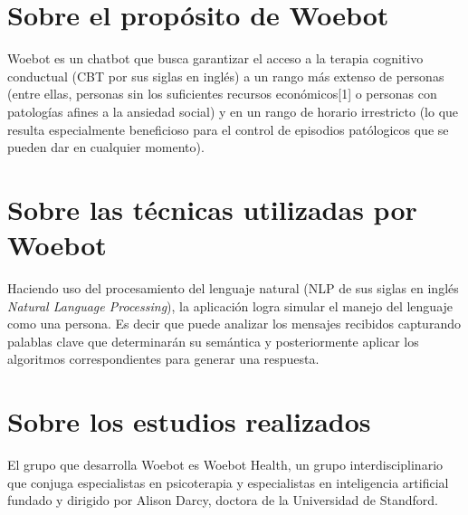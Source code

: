 \documentclass[11pt]{article}
\begin{document}


\section{Sobre el propósito de Woebot}
Woebot es un chatbot que busca garantizar el acceso a la terapia 
cognitivo conductual (CBT por sus siglas en inglés) a 
un rango más extenso de personas (entre ellas, personas 
sin los suficientes recursos económicos[1] o personas con 
patologías afines a la ansiedad social) y en un rango 
de horario irrestricto (lo que resulta especialmente 
beneficioso para el control de episodios patólogicos 
que se pueden dar en cualquier momento). 


\section{Sobre las técnicas utilizadas por Woebot}
Haciendo uso del procesamiento del lenguaje natural (NLP de sus siglas en inglés 
\textit{Natural Language Processing}), la aplicación 
logra simular el manejo del lenguaje como una persona. 
Es decir que puede analizar los mensajes recibidos 
capturando 
palablas clave 
que determinarán su semántica
y posteriormente aplicar los
algoritmos correspondientes para generar una respuesta.


\section{Sobre los estudios realizados}
El grupo que desarrolla Woebot es Woebot Health, un grupo interdisciplinario que conjuga especialistas en psicoterapia y especialistas en inteligencia artificial fundado y dirigido por Alison Darcy, doctora de la Universidad de Standford.
\end{document}
